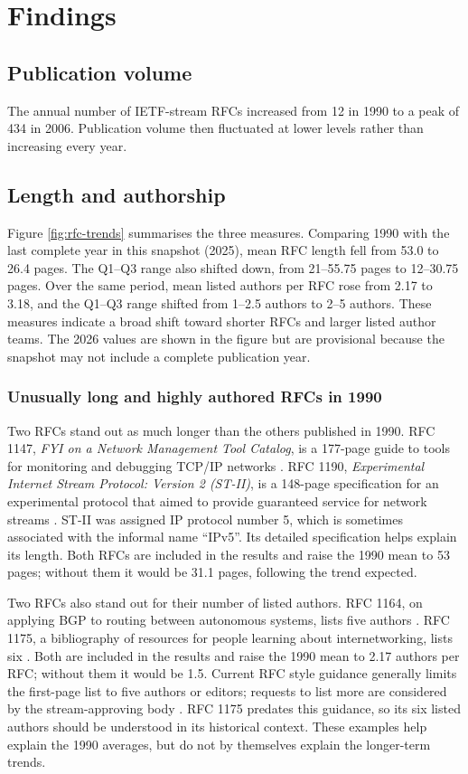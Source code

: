 \documentclass{l4proj}
\begin{document}
\chapter{Findings}
\section{Publication volume}
The annual number of IETF-stream RFCs increased from 12 in 1990 to a peak of 434 in 2006. Publication volume then fluctuated at lower levels rather than increasing every year.

\section{Length and authorship}
Figure \ref{fig:rfc-trends} summarises the three measures. Comparing 1990 with the last complete year in this snapshot (2025), mean RFC length fell from 53.0 to 26.4 pages. The Q1--Q3 range also shifted down, from 21--55.75 pages to 12--30.75 pages. Over the same period, mean listed authors per RFC rose from 2.17 to 3.18, and the Q1--Q3 range shifted from 1--2.5 authors to 2--5 authors. These measures indicate a broad shift toward shorter RFCs and larger listed author teams. The 2026 values are shown in the figure but are provisional because the snapshot may not include a complete publication year.

\subsection{Unusually long and highly authored RFCs in 1990}
Two RFCs stand out as much longer than the others published in 1990. RFC 1147, \emph{FYI on a Network Management Tool Catalog}, is a 177-page guide to tools for monitoring and debugging TCP/IP networks \citep{RFC1147}. RFC 1190, \emph{Experimental Internet Stream Protocol: Version 2 (ST-II)}, is a 148-page specification for an experimental protocol that aimed to provide guaranteed service for network streams \citep{RFC1190}. ST-II was assigned IP protocol number 5, which is sometimes associated with the informal name ``IPv5''. Its detailed specification helps explain its length. Both RFCs are included in the results and raise the 1990 mean to 53 pages; without them it would be 31.1 pages, following the trend expected.

Two RFCs also stand out for their number of listed authors. RFC 1164, on applying BGP to routing between autonomous systems, lists five authors \citep{RFC1164}. RFC 1175, a bibliography of resources for people learning about internetworking, lists six \citep{RFC1175}. Both are included in the results and raise the 1990 mean to 2.17 authors per RFC; without them it would be 1.5. Current RFC style guidance generally limits the first-page list to five authors or editors; requests to list more are considered by the stream-approving body \citep{RFC7322}. RFC 1175 predates this guidance, so its six listed authors should be understood in its historical context. These examples help explain the 1990 averages, but do not by themselves explain the longer-term trends.
\end{document}
